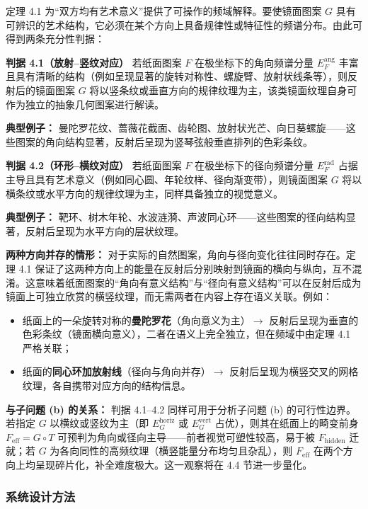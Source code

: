 \documentclass[12pt,a4paper]{ctexart}
\begin{document}
定理 4.1 为``双方均有艺术意义''提供了可操作的频域解释。要使镜面图案 $G$ 具有可辨识的艺术结构，它必须在某个方向上具备规律性或特征性的频谱分布。由此可得到两条充分性判据：

\textbf{判据 4.1（放射--竖纹对应）} 若纸面图案 $F$ 在极坐标下的角向频谱分量 $E_F^{\mathrm{ang}}$ 丰富且具有清晰的结构（例如呈现显著的旋转对称性、螺旋臂、放射状线条等），则反射后的镜面图案 $G$ 将以竖条纹或垂直方向的规律纹理为主，该类镜面纹理自身可作为独立的抽象几何图案进行解读。

\textbf{典型例子：} 曼陀罗花纹、蔷薇花截面、齿轮图、放射状光芒、向日葵螺旋——这些图案的角向结构显著，反射后呈现为竖琴弦般垂直排列的色彩条纹。

\textbf{判据 4.2（环形--横纹对应）} 若纸面图案 $F$ 在极坐标下的径向频谱分量 $E_F^{\mathrm{rad}}$ 占据主导且具有艺术意义（例如同心圆、年轮纹样、径向渐变带），则镜面图案 $G$ 将以横条纹或水平方向的规律纹理为主，同样具备独立的视觉意义。

\textbf{典型例子：} 靶环、树木年轮、水波涟漪、声波同心环——这些图案的径向结构显著，反射后呈现为水平方向的层状纹理。

\textbf{两种方向并存的情形：} 对于实际的自然图案，角向与径向变化往往同时存在。定理 4.1 保证了这两种方向上的能量在反射后分别映射到镜面的横向与纵向，互不混淆。这意味着纸面图案的``角向有意义结构''与``径向有意义结构''可以在反射后成为镜面上可独立欣赏的横竖纹理，而无需两者在内容上存在语义关联。例如：
\begin{itemize}
    \item 纸面上的一朵旋转对称的\textbf{曼陀罗花}（角向意义为主）$\rightarrow$ 反射后呈现为垂直的色彩条纹（镜面横向意义），二者在语义上完全独立，但在频域中由定理 4.1 严格关联；
    \item 纸面的\textbf{同心环加放射线}（径向与角向并存）$\rightarrow$ 反射后呈现为横竖交叉的网格纹理，各自携带对应方向的结构信息。
\end{itemize}

\textbf{与子问题 (b) 的关系：} 判据 4.1--4.2 同样可用于分析子问题 (b) 的可行性边界。若指定 $G$ 以横纹或竖纹为主（即 $E_G^{\mathrm{horiz}}$ 或 $E_G^{\mathrm{vert}}$ 占优），则其在纸面上的畸变前身 $F_{\mathrm{eff}} = G\circ T$ 可预判为角向或径向主导——前者视觉可塑性较高，易于被 $F_{\mathrm{hidden}}$ 迁就；若 $G$ 为各向同性的高频纹理（横竖能量分布均匀且杂乱），则 $F_{\mathrm{eff}}$ 在两个方向上均呈现碎片化，补全难度极大。这一观察将在 4.4 节进一步量化。

\subsubsection{系统设计方法}
\end{document}
